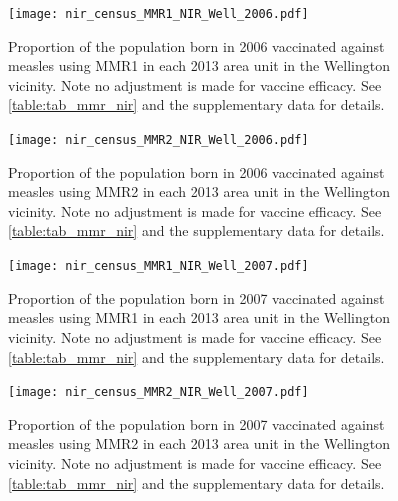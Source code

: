 \documentclass{article}
\begin{document}
% 
\begin{figure}
   \begin{center}
    \texttt{[image: nir\_census\_MMR1\_NIR\_Well\_2006.pdf]}
    \end{center}
    \caption{Proportion of the population born in 2006 vaccinated against measles using MMR1 in each 2013 area unit in the Wellington vicinity. Note no adjustment is made for vaccine efficacy. See \autoref{table:tab_mmr_nir} and the supplementary data for details.}
\label{fig:fig12006_w}
\end{figure}
% 
\begin{figure}
\begin{center}
\texttt{[image: nir\_census\_MMR2\_NIR\_Well\_2006.pdf]}
\end{center}
    \caption{Proportion of the population born in 2006 vaccinated against measles using MMR2 in each 2013 area unit in the Wellington vicinity. Note no adjustment is made for vaccine efficacy. See \autoref{table:tab_mmr_nir} and the supplementary data for details.}
\label{fig:fig22006_w}
\end{figure}
% 
% 
\begin{figure}
\begin{center}
\texttt{[image: nir\_census\_MMR1\_NIR\_Well\_2007.pdf]}
\end{center}
    \caption{Proportion of the population born in 2007 vaccinated against measles using MMR1 in each 2013 area unit in the Wellington vicinity. Note no adjustment is made for vaccine efficacy. See \autoref{table:tab_mmr_nir} and the supplementary data for details.}
\label{fig:fig12007_w}
\end{figure}
\begin{figure}
\begin{center}
    \texttt{[image: nir\_census\_MMR2\_NIR\_Well\_2007.pdf]}
\end{center}
    \caption{Proportion of the population born in 2007 vaccinated against measles using MMR2 in each 2013 area unit in the Wellington vicinity. Note no adjustment is made for vaccine efficacy. See \autoref{table:tab_mmr_nir} and the supplementary data for details.}
\label{fig:fig22007_w}
\end{figure}
\end{document}
